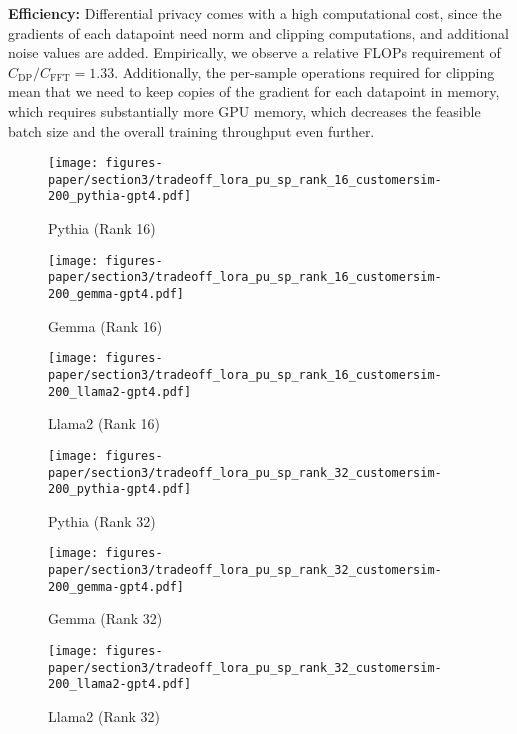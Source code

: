 \noindent
\textbf{Efficiency:}
Differential privacy comes with a high computational cost, since the gradients of each datapoint need norm and clipping computations, and additional noise values are added.
Empirically, we observe a relative FLOPs requirement of $C_{\text{DP}} / C_{\text{FFT}} = 1.33$.
Additionally, the per-sample operations required for clipping mean that we need to keep copies of the gradient for each datapoint in memory, which requires substantially more GPU memory, which decreases the feasible batch size and the overall training throughput even further.

\begin{figure*}[t]
    \centering
    \begin{subfigure}{0.3\textwidth}
        \centering
        \texttt{[image: figures-paper/section3/tradeoff\_lora\_pu\_sp\_rank\_16\_customersim-200\_pythia-gpt4.pdf]}
        \caption{Pythia (Rank 16)}
        \label{fig:lora_16_csima}
    \end{subfigure}
    \begin{subfigure}{0.3\textwidth}
        \centering
        \texttt{[image: figures-paper/section3/tradeoff\_lora\_pu\_sp\_rank\_16\_customersim-200\_gemma-gpt4.pdf]}
        \caption{Gemma (Rank 16)}
        \label{fig:lora_16_csimb}
    \end{subfigure}
    \begin{subfigure}{0.3\textwidth}
        \centering
        \texttt{[image: figures-paper/section3/tradeoff\_lora\_pu\_sp\_rank\_16\_customersim-200\_llama2-gpt4.pdf]}
        \caption{Llama2 (Rank 16)}
        \label{fig:lora_16_csimc}
    \end{subfigure}

    \begin{subfigure}{0.3\textwidth}
        \centering
        \texttt{[image: figures-paper/section3/tradeoff\_lora\_pu\_sp\_rank\_32\_customersim-200\_pythia-gpt4.pdf]}
        \caption{Pythia (Rank 32)}
        \label{fig:lora_32_csima}
    \end{subfigure}
    \begin{subfigure}{0.3\textwidth}
        \centering
        \texttt{[image: figures-paper/section3/tradeoff\_lora\_pu\_sp\_rank\_32\_customersim-200\_gemma-gpt4.pdf]}
        \caption{Gemma (Rank 32)}
        \label{fig:lora_32_csimb}
    \end{subfigure}
    \begin{subfigure}{0.3\textwidth}
        \centering
        \texttt{[image: figures-paper/section3/tradeoff\_lora\_pu\_sp\_rank\_32\_customersim-200\_llama2-gpt4.pdf]}
        \caption{Llama2 (Rank 32)}
        \label{fig:lora_32_csimc}
    \end{subfigure}


\end{figure*}
